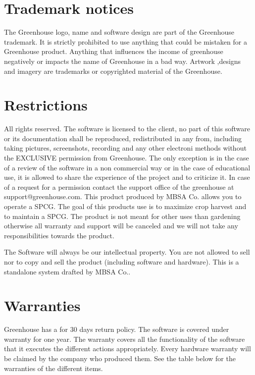 \section{Trademark notices}
The Greenhouse logo, name and software design are part of the Greenhouse
trademark. It is strictly prohibited to use anything that could be mistaken for
a Greenhouse product. Anything that influences the income of greenhouse
negatively or impacts the name of Greenhouse in a bad way. Artwork ,designs and
imagery are trademarks or copyrighted material of the Greenhouse.


\section{Restrictions}
All rights reserved. The software is licensed to the client, no part of this
software or its documentation shall be reproduced, redistributed in any from,
including taking pictures, screenshots, recording and any other electroni
methods  without the EXCLUSIVE permission from Greenhouse. The only exception is
in the case of a review of the software in a non commercial way or in the case
of educational use, it is allowed to share the experience of the project and to
criticize it.  In case of a request for a permission contact the support office
of the greenhouse at support@greenhouse.com. This product produced by MBSA Co.
allows you to operate a SPCG. The goal of this products use is to maximize crop harvest and to maintain a SPCG. The product is not meant for other uses than gardening otherwise all warranty and support will be canceled and we will not take any responsibilities towards the product.

The Software will always be our intellectual property. You are not allowed to
sell nor to copy and sell the product (including software and hardware). This is
a standalone system drafted by MBSA Co..

\section{Warranties}
Greenhouse has a for 30 days return policy. The software is covered under
warranty for one year. The warranty covers all the functionality of the software
that it executes the different actions appropriately.
Every hardware warranty will be claimed by the company who produced them.  See
the table below for the warranties of the different items.

